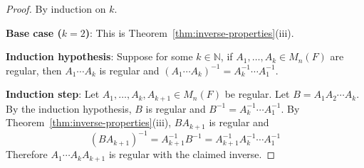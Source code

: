 \begin{proof}
    By induction on $k$.
    
    \textbf{Base case ($k=2$)}: This is Theorem~\ref{thm:inverse-properties}(iii).
    
    \textbf{Induction hypothesis}: Suppose for some $k \in \mathbb{N}$, if $A_1, \ldots, A_k \in M_n(F)$ are regular, then $A_1\cdots A_k$ is regular and $(A_1\cdots A_k)^{-1} = A_k^{-1}\cdots A_1^{-1}$.
    
    \textbf{Induction step}: Let $A_1, \ldots, A_k, A_{k+1} \in M_n(F)$ be regular. Let $B = A_1A_2\cdots A_k$. By the induction hypothesis, $B$ is regular and $B^{-1} = A_k^{-1}\cdots A_1^{-1}$. By Theorem~\ref{thm:inverse-properties}(iii), $BA_{k+1}$ is regular and
    \[
    (BA_{k+1})^{-1} = A_{k+1}^{-1}B^{-1} = A_{k+1}^{-1}A_k^{-1}\cdots A_1^{-1}
    \]
    Therefore $A_1\cdots A_kA_{k+1}$ is regular with the claimed inverse.
\end{proof}